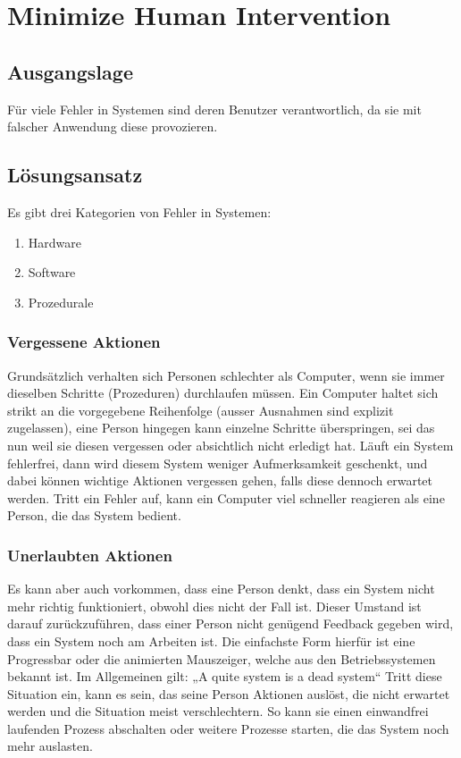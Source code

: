 
\section{Minimize Human Intervention}

\subsection{Ausgangslage}

Für viele Fehler in Systemen sind deren Benutzer verantwortlich, da sie mit falscher Anwendung diese provozieren.
\subsection{Lösungsansatz}

Es gibt drei Kategorien von Fehler in Systemen:
\begin{enumerate}
	\item Hardware
	\item Software
	\item Prozedurale
\end{enumerate}


\subsubsection*{Vergessene Aktionen}

Grundsätzlich verhalten sich Personen schlechter als Computer, wenn sie immer dieselben Schritte (Prozeduren) durchlaufen müssen. Ein Computer haltet sich strikt an die vorgegebene Reihenfolge (ausser Ausnahmen sind explizit zugelassen), eine Person hingegen kann einzelne Schritte überspringen, sei das nun weil sie diesen vergessen oder absichtlich nicht erledigt hat. Läuft ein System fehlerfrei, dann wird diesem System weniger Aufmerksamkeit geschenkt, und dabei können wichtige Aktionen vergessen gehen, falls diese dennoch erwartet werden.
Tritt ein Fehler auf, kann ein Computer viel schneller reagieren als eine Person, die das System bedient.

\subsubsection*{Unerlaubten Aktionen}

Es kann aber auch vorkommen, dass eine Person denkt, dass ein System nicht mehr richtig funktioniert, obwohl dies nicht der Fall ist. Dieser Umstand ist darauf zurückzuführen, dass einer Person nicht genügend Feedback gegeben wird, dass ein System noch am Arbeiten ist. Die einfachste Form hierfür ist eine Progressbar oder die animierten Mauszeiger, welche aus den Betriebssystemen bekannt ist.
Im Allgemeinen gilt: „A quite system is a dead system“
Tritt diese Situation ein, kann es sein, das seine Person Aktionen auslöst, die nicht erwartet werden und die Situation meist verschlechtern. So kann sie einen einwandfrei laufenden Prozess abschalten oder weitere Prozesse starten, die das System noch mehr auslasten.
